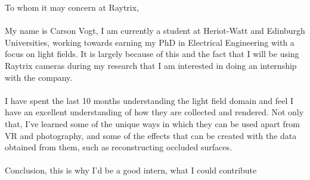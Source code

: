 \documentclass[12pt]{report}
\begin{document}
\noindent To whom it may concern at Raytrix,
\\ \\
My name is Carson Vogt, I am currently a student at Heriot-Watt and Edinburgh Universities, working towards earning my PhD in Electrical Engineering with a focus on light fields. It is largely because of this and the fact that I will be using Raytrix cameras during my research that I am interested in doing an internship with the company.
\\ \\
I have spent the last 10 months understanding the light field domain and feel I have an excellent understanding of how they are collected and rendered. Not only that, I've learned some of the unique ways in which they can be used apart from VR and photography, and some of the effects that can be created with the data obtained from them, such as reconstructing occluded surfaces.
\\ \\
Conclusion, this is why I'd be a good intern, what I could contribute
\end{document}
